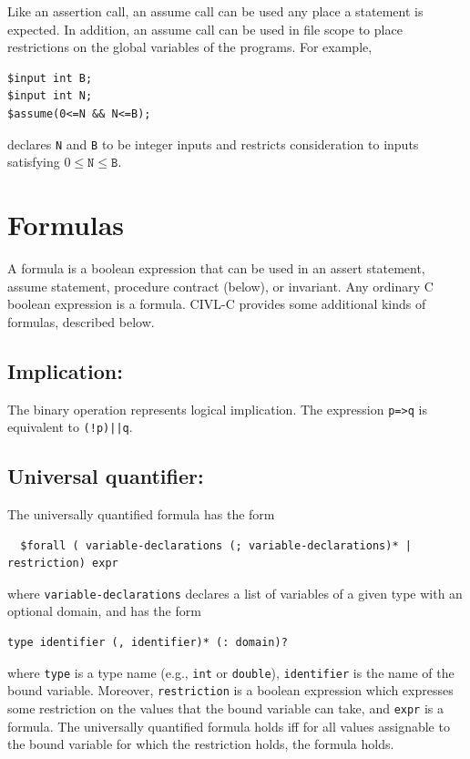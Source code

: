 Like an assertion call, an assume call can be used any place
a statement is expected.  In addition, an assume call can be used
in file scope to place restrictions on the global variables of the
programs.  For example,
\begin{verbatim}
$input int B;
$input int N;
$assume(0<=N && N<=B);
\end{verbatim}
declares \texttt{N} and \texttt{B} to be integer inputs and restricts
consideration to inputs satisfying $0\leq\texttt{N}\leq\texttt{B}$.


\section{Formulas}

A formula is a boolean expression that can be used in an assert
statement, assume statement, procedure contract (below), or invariant.
Any ordinary C boolean expression is a formula. CIVL-C provides some
additional kinds of formulas, described below.

\subsection{Implication: \cimplies}

The binary operation \cimplies{} represents logical implication.
The expression \verb!p=>q! is equivalent to \verb~(!p)||q~.

\subsection{Universal quantifier: \cforall}

The universally quantified formula has the form
\begin{verbatim}
  $forall ( variable-declarations (; variable-declarations)* | restriction) expr
\end{verbatim}
where \verb!variable-declarations! declares a list of variables of a
given type with an optional domain, and has the form
\begin{verbatim}
type identifier (, identifier)* (: domain)?
\end{verbatim}
where \verb!type! is a type name (e.g., \texttt{int} or
\texttt{double}), \verb!identifier! is the name of the bound variable.
Moreover, \verb!restriction! is a boolean expression which expresses
some restriction on the values that the bound variable can take, and
\verb!expr! is a formula.  The universally quantified formula holds
iff for all values assignable to the bound variable for which the
restriction holds, the formula  holds.


